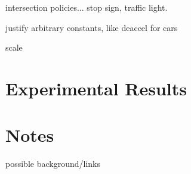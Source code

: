 \documentclass[12pt]{article}
\begin{document}
intersection policies... stop sign, traffic light.

justify arbitrary constants, like deaccel for cars

scale


\section{Experimental Results}



\section{Notes}

possible background/links
\end{document}

